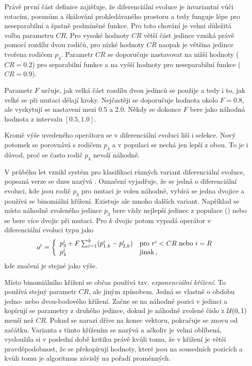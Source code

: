 Právě první část definice zajišťuje, že diferenciální evoluce je invariantní vůči rotacím, posunům a škálování prohledávaného prostoru a tedy funguje lépe pro neseparabilní a špatně podmíněné funkce. Pro toto chování je velmi důležitá volba parametru $CR$. Pro vysoké hodnoty $CR$ větší část jedince vzniká právě pomocí rozdílu dvou rodičů, pro nízké hodnoty $CR$ naopak je většina jedince tvořena rodičem $p_4$. Parametr $CR$ se doporučuje nastavovat na nižší hodnoty ($CR=0.2$) pro separabilní funkce a na vyšší hodnoty pro neseparabilní funkce ($CR=0.9$). 

Parametr $F$ určuje, jak velká část rozdílu dvou jedinců se použije a tedy i to, jak velké se při mutaci dělají kroky. Nejčastěji se doporučuje hodnota okolo $F=0.8$, ale vyskytují se nastavení mezi 0.5 a 2.0. Někdy se dokonce $F$ bere jako náhodná hodnota z intervalu $[0.5, 1.0]$. 

Kromě výše uvedeného operátoru se v diferenciální evoluci liší i selekce. Nový potomek se porovnává s rodičem $p_4$ a v populaci se nechá jen lepší z obou. To je i důvod, proč se často rodič $p_4$ nevolí náhodně.

V průběhu let vznikl systém pro klasifikaci různých variant diferenciální evoluce, popsaná verze se dnes nazývá . Označení vyjadřuje, že se jedná o diferenciální evoluci, kde jsou rodič $p_3$ pro mutaci je volen náhodně, vybírá se jedna dvojice a používá se binomiální křížení. Existuje ale mnoho dalších variant\cite{Mezura-Montes:2006:CSD:1143997.1144086}. Například se místo náhodně zvoleného jedince $p_3$ bere vždy nejlepší jedinec z populace () nebo se bere více dvojic při mutaci. Pro $k$ dvojic potom vypadá operátor v diferenciální evoluci typu  jako
$$o^i = \left\{ \begin{array}{ll} p_3^i + F\sum_{i=1}^k(p_{1,k}^i-p_{2,k}^i) & \text{pro } r^i < CR \text{ nebo } i = R \\ p_4^i & \text{jinak} \,, \end{array} \right.$$
kde značení je stejné jako výše. 

Místo binomiálního křížení se občas používá tzv. \emph{exponenciální křížení}. To používá stejný parametr $CR$, ale jiným způsobem. Jedná se vlastně o obdobu jedno- nebo dvou-bodového křížení. Začne se na náhodné pozici v jedinci a kopírují se parametry z druhého jedince, dokud je náhodně zvolené číslo z $\mathcal{U}(0, 1)$ menší než $CR$. Pokud se narazí dříve na konec vektoru, pokračuje se znovu od začátku. Varianta s tímto křížením se nazývá  a ačkoliv je velmi oblíbená, vysloužila si v poslední době kritiku\cite{Tanabe2014} právě kvůli tomu, že v křížení je větší pravděpodobnost, že se překopírují hodnoty, které jsou na sousedních pozicích a kvůli tomu je algoritmus závislý na pořadí proměnných.
